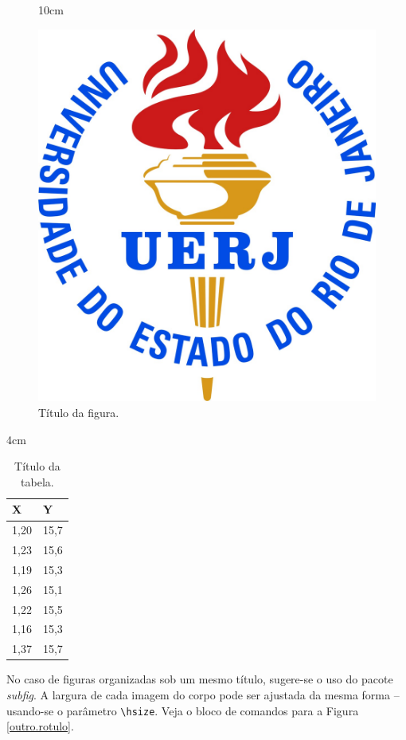 \documentclass[a4paper,12pt,oneside,onecolumn,final,fleqn]{repUERJ}
\begin{document}
\begin{figure}[!ht]{10cm}
  \caption{Título da figura.} \label{rotulo}
  \includegraphics[width=\hsize]{logo_uerj_cor.jpg}
\end{figure}

\begin{table}[!ht]{4cm}
  \caption{Título da tabela.}\label{mais.rotulo}
  \hfill\begin{tabular}{l|l}
    \hline
      X & Y\\
    \hline
      1,20 & 15,7\\
      1,23 & 15,6\\
      1,19 & 15,3\\
      1,26 & 15,1\\
      1,22 & 15,5\\
      1,16 & 15,3\\
      1,37 & 15,7\\
    \hline
  \end{tabular}\hfill
\end{table}

No caso de figuras organizadas sob um mesmo título, sugere-se o uso do pacote \textsl{subfig}. A largura de cada imagem do corpo pode ser ajustada da mesma forma -- usando-se o parâmetro \texttt{\textbackslash hsize}. Veja o bloco de comandos para a Figura \ref{outro.rotulo}.%
\end{document}
